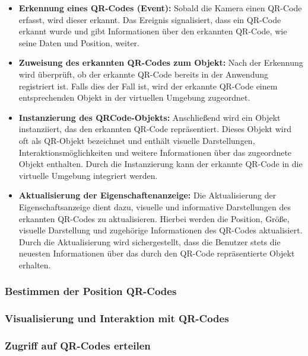 \begin{itemize}
\item \textbf{Erkennung eines QR-Codes (Event):}
Sobald die Kamera einen QR-Code erfasst, wird dieser erkannt. Das Ereignis signalisiert, dass ein QR-Code erkannt wurde
und gibt Informationen über den erkannten QR-Code, wie seine Daten und Position, weiter.

\item \textbf{Zuweisung des erkannten QR-Codes zum Objekt:}
Nach der Erkennung wird überprüft, ob der erkannte QR-Code bereits in der Anwendung registriert ist. Falls dies der Fall
ist, wird der erkannte QR-Code einem entsprechenden Objekt in der virtuellen Umgebung zugeordnet.

\item \textbf{Instanzierung des QRCode-Objekts:}
Anschließend wird ein Objekt instanziiert, das den erkannten QR-Code repräsentiert. Dieses Objekt wird oft als
QR-Objekt bezeichnet und enthält visuelle Darstellungen, Interaktionsmöglichkeiten und weitere Informationen über das
zugeordnete Objekt enthalten. Durch die Instanzierung kann der erkannte QR-Code in die virtuelle Umgebung integriert werden.

\item \textbf{Aktualisierung der Eigenschaftenanzeige:}
Die Aktualisierung der Eigenschaftsanzeige dient dazu, visuelle und informative Darstellungen des erkannten QR-Codes zu
aktualisieren. Hierbei werden die Position, Größe, visuelle Darstellung und zugehörige Informationen des QR-Codes aktualisiert.
Durch die Aktualisierung wird sichergestellt, dass die Benutzer stets die neuesten Informationen über das durch den QR-Code
repräsentierte Objekt erhalten.

\end{itemize}

\subsubsection{Bestimmen der Position QR-Codes}

\subsubsection{Visualisierung und Interaktion mit QR-Codes}

\subsubsection{Zugriff auf QR-Codes erteilen}

